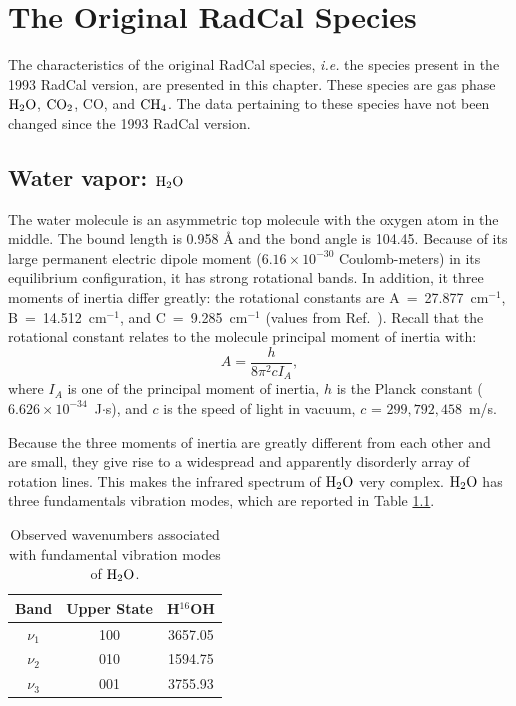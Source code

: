 

\chapter{The Original RadCal Species}
\label{chap:old_species}

The characteristics of the original RadCal species, \textit{i.e.} the species present in the 1993 RadCal version, are presented in this chapter. These species are gas phase $\rm H_2O$, $\rm CO_2$, CO, and $\rm CH_4$. The data pertaining to these species have not been changed since the 1993 RadCal version.

\section{Water vapor: $\rm H_2O$}

The water molecule is an asymmetric top molecule with the oxygen atom in the middle. The bound length is 0.958 \AA{} and the bond angle is 104.45\textdegree. Because of its large permanent electric dipole moment ($6.16 \times 10^{-30}$ Coulomb-meters) in its equilibrium configuration, it has strong rotational bands. In addition, it three moments of inertia differ greatly: the rotational constants are A~=~27.877~cm$^{-1}$, B~=~14.512~cm$^{-1}$, and C~=~9.285~cm$^{-1}$ (values from Ref.~\cite{NIST2013}). Recall that the rotational constant relates to the molecule principal moment of inertia with:
\begin{equation}
 A = \dfrac{h}{8 \pi^2 c I_A},
\end{equation}
where $I_A$ is one of the principal moment of inertia, $h$ is the Planck constant ($6.626 \times 10^{-34}$~J$\cdot$s), and $c$ is the speed of light in vacuum, $c$ = $299,792,458$~m/s.

Because the three moments of inertia are greatly different from each other and are small, they give rise to a widespread and apparently disorderly array of rotation lines. This makes the infrared spectrum of $\rm H_2O$ very complex. $\rm H_2O$ has three fundamentals vibration modes, which are reported in Table \ref{table::fund_H2O}.

\begin{table}[ht]
    \centering
    \caption{Observed wavenumbers associated with fundamental vibration modes of $\rm H_2O$.}
    \label{table::fund_H2O}
    \begin{tabular}{|c|c|c|} \hline
    Band & Upper State & H$^{16}$OH  \\
    \hline
    $\nu_1$  &  100 & 3657.05 \\
    $\nu_2$  &  010 & 1594.75 \\
    $\nu_3$  &  001 & 3755.93 \\
    \hline
   \end{tabular}
\end{table}


